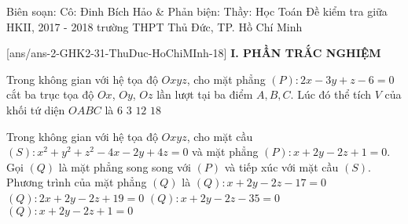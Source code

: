 
	\begin{name}
{Biên soạn: Cô: Đinh Bích Hảo  \& Phản biện: Thầy: Học Toán }
		{Đề kiểm tra giữa HKII, 2017 - 2018 trường THPT Thủ Đức, TP. Hồ Chí Minh}
	\end{name}
	\setcounter{ex}{0}\setcounter{bt}{0}
	[ans/ans-2-GHK2-31-ThuDuc-HoChiMInh-18]
\noindent\textbf{I. PHẦN TRẮC NGHIỆM} 
\begin{ex}%
Trong không gian với hệ tọa độ $Oxyz$, cho mặt phẳng $(P)\colon 2x-3y+z-6=0 $ cắt ba trục tọa độ $Ox$, $Oy$, $Oz$ lần lượt tại ba điểm $A,B,C$. Lúc đó thể tích $V$ của khối tứ diện $OABC$ là
\choice
	{\True $ 6$}
	{$3 $}
	{$ 12$}
	{ $ 18$}
\end{ex}
\begin{ex}%
Trong không gian với hệ tọa độ $Oxyz$, cho mặt cầu $(S)\colon  x^2+y^2+z^2-4x-2y+4z=0$ và mặt phẳng $(P)\colon x+2y-2z+1=0$. Gọi $(Q)$ là mặt phẳng song song với $(P)$ và tiếp xúc với mặt cầu $(S)$. Phương trình của mặt phẳng $(Q)$ là
\choice
	{\True $(Q): x+2y-2z-17=0 $}
	{$(Q): 2x+2y-2z+19=0 $}
	{$(Q): x+2y-2z-35=0 $}
	{ $(Q): x+2y-2z+1=0 $}
\end{ex}
